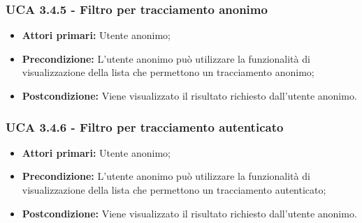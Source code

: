 \subsubsection{UCA 3.4.5 - Filtro per tracciamento anonimo}%
\begin{itemize}
	\item \textbf{Attori primari:} Utente anonimo;
	\item \textbf{Precondizione:} L’utente anonimo può utilizzare la funzionalità di visualizzazione della lista che permettono un tracciamento anonimo;
	\item \textbf{Postcondizione:} Viene visualizzato il risultato richiesto dall’utente anonimo.
\end{itemize}

\subsubsection{UCA 3.4.6 - Filtro per tracciamento autenticato}%
\begin{itemize}
	\item \textbf{Attori primari:} Utente anonimo;
	\item \textbf{Precondizione:} L’utente anonimo può utilizzare la funzionalità di visualizzazione della lista che permettono un tracciamento autenticato;
	\item \textbf{Postcondizione:} Viene visualizzato il risultato richiesto dall’utente anonimo.
\end{itemize}

